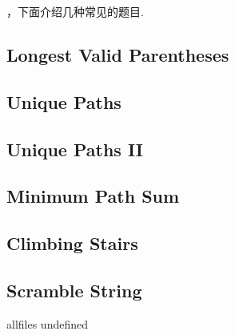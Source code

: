 \documentclass{article}
\begin{document}
\begin{CJK}{UTF8}{gbsn}     %

\else
    
，下面介绍几种常见的题目.
\\
\fi
\subsection{Longest Valid Parentheses}

\subsection{Unique Paths}

\subsection{Unique Paths II}

\subsection{Minimum Path Sum}

\subsection{Climbing Stairs}

\subsection{Scramble String}


\ifx allfiles undefined
\end{CJK}
\end{document}
